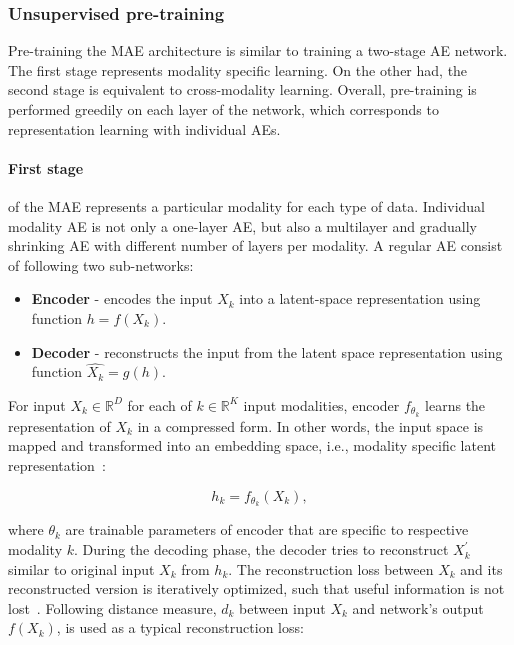 \subsubsection{Unsupervised pre-training} 
Pre-training the MAE architecture is similar to training a two-stage AE network. The first stage represents modality specific learning. On the other had, the second stage is equivalent to cross-modality learning. 
Overall, pre-training is performed greedily on each layer of the network, which corresponds to representation learning with individual AEs. 

\paragraph{First stage}\noindent of the MAE represents a particular modality for each type of data. Individual modality AE is not only a one-layer AE, but also a multilayer and gradually shrinking AE with different number of layers per modality. A regular AE consist of following two sub-networks: 
\begin{itemize}[noitemsep]
    \item \textbf{Encoder} - encodes the input $X_{k}$ into a latent-space representation using function $h = f(X_{k})$.
    \item \textbf{Decoder} - reconstructs the input from the latent space representation using function $\hat{X_k} = g(h)$. 
\end{itemize}

\hspace*{3.5mm} For input $X_{k} \in \mathbb{R}^{D}$ for each of $k \in \mathbb{R}^K$ input modalities, encoder $f_{\theta_{k}}$ learns the representation of $X_{k}$ in a compressed form. In other words, the input space is mapped and transformed into an embedding space, i.e., modality specific latent representation~\cite{mmdcae}: 

\begin{equation}
    h_{k}=f_{\theta_{k}}\left({X}_{k}\right),
\end{equation}

\hspace*{3.5mm} where $\theta_{k}$ are trainable parameters of encoder that are specific to respective modality $k$. During the decoding phase, the decoder tries to reconstruct ${X}_{k}^{\prime}$ similar to original input ${X}_{k}$ from $h_{k}$. The reconstruction loss between $X_{k}$ and its reconstructed version is iteratively optimized, such that useful information is not lost~\cite{KarimIEEEAccess2019}. Following distance measure, $d_{k}$ between input $X_{k}$ and network's output $f(X_{k})$, is used as a typical reconstruction loss: 

